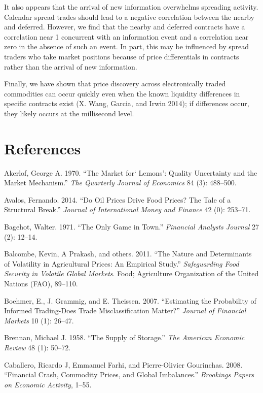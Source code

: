 \documentclass[review,12pt]{elsarticle}
\begin{document}
\begin{linenumbers}
It also appears that the arrival of new information overwhelms spreading
activity. Calendar spread trades should lead to a negative correlation
between the nearby and deferred. However, we find that the nearby and
deferred contracts have a correlation near 1 concurrent with an
information event and a correlation near zero in the absence of such an
event. In part, this may be influenced by spread traders who take market
positions because of price differentials in contracts rather than the
arrival of new information.

Finally, we have shown that price discovery across electronically traded
commodities can occur quickly even when the known liquidity differences
in specific contracts exist (X. Wang, Garcia, and Irwin 2014); if
differences occur, they likely occurs at the millisecond level.


\clearpage

\section*{References}\label{references}

Akerlof, George A. 1970. ``The Market for` Lemons': Quality Uncertainty
and the Market Mechanism.'' \emph{The Quarterly Journal of Economics} 84
(3): 488--500.

Avalos, Fernando. 2014. ``Do Oil Prices Drive Food Prices? The Tale of a
Structural Break.'' \emph{Journal of International Money and Finance} 42
(0): 253--71.

Bagehot, Walter. 1971. ``The Only Game in Town.'' \emph{Financial
Analysts Journal} 27 (2): 12--14.

Balcombe, Kevin, A Prakash, and others. 2011. ``The Nature and
Determinants of Volatility in Agricultural Prices: An Empirical Study.''
\emph{Safeguarding Food Security in Volatile Global Markets}. Food;
Agriculture Organization of the United Nations (FAO), 89--110.

Boehmer, E., J. Grammig, and E. Theissen. 2007. ``Estimating the
Probability of Informed Trading-Does Trade Misclassification Matter?''
\emph{Journal of Financial Markets} 10 (1): 26--47.

Brennan, Michael J. 1958. ``The Supply of Storage.'' \emph{The American
Economic Review} 48 (1): 50--72.

Caballero, Ricardo J, Emmanuel Farhi, and Pierre-Olivier Gourinchas.
2008. ``Financial Crash, Commodity Prices, and Global Imbalances.''
\emph{Brookings Papers on Economic Activity}, 1--55.


\end{linenumbers}
\end{document}
